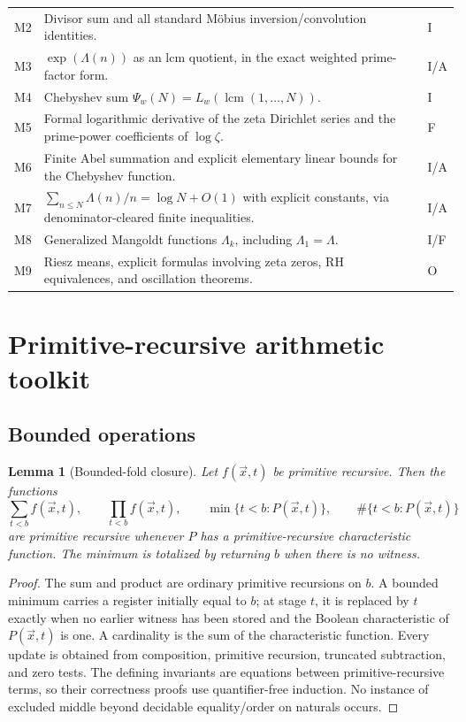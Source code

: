 \documentclass[11pt]{article}
\newtheorem{lemma}[theorem]{Lemma}
\theoremstyle{definition}
\newcommand{\StatusI}{\textsf{I}}
\newcommand{\StatusF}{\textsf{F}}
\newcommand{\StatusA}{\textsf{A}}
\newcommand{\StatusO}{\textsf{O}}
\begin{document}
\begin{longtable}{@{}p{}p{}p{}@{}}
M2 & Divisor sum and all standard M\"obius inversion/convolution identities. & \StatusI\\
M3 & \(\exp(\Lambda(n))\) as an lcm quotient, in the exact weighted prime-factor form. & \StatusI/\StatusA\\
M4 & Chebyshev sum \(\Psi_w(N)=L_w(\operatorname{lcm}(1,\dots,N))\). & \StatusI\\
M5 & Formal logarithmic derivative of the zeta Dirichlet series and the prime-power coefficients of \(\log\zeta\). & \StatusF\\
M6 & Finite Abel summation and explicit elementary linear bounds for the Chebyshev function. & \StatusI/\StatusA\\
M7 & \(\sum_{n\le N}\Lambda(n)/n=\log N+O(1)\) with explicit constants, via denominator-cleared finite inequalities. & \StatusI/\StatusA\\
M8 & Generalized Mangoldt functions \(\Lambda_k\), including \(\Lambda_1=\Lambda\). & \StatusI/\StatusF\\
M9 & Riesz means, explicit formulas involving zeta zeros, RH equivalences, and oscillation theorems. & \StatusO\\
\bottomrule
\end{longtable}

\section{Primitive-recursive arithmetic toolkit}

\subsection{Bounded operations}

\begin{lemma}[Bounded-fold closure]\label{lem:bounded-fold}
Let \(f(\vec x,t)\) be primitive recursive.  Then the functions
\[
 \sum_{t<b}f(\vec x,t),\qquad
 \prod_{t<b}f(\vec x,t),\qquad
 \min\{t<b:P(\vec x,t)\},\qquad
 \#\{t<b:P(\vec x,t)\}
\]
are primitive recursive whenever \(P\) has a primitive-recursive
characteristic function.  The minimum is totalized by returning \(b\) when
there is no witness.
\end{lemma}

\begin{proof}
The sum and product are ordinary primitive recursions on \(b\).  A bounded
minimum carries a register initially equal to \(b\); at stage \(t\), it is
replaced by \(t\) exactly when no earlier witness has been stored and the
Boolean characteristic of \(P(\vec x,t)\) is one.  A cardinality is the sum of
the characteristic function.  Every update is obtained from composition,
primitive recursion, truncated subtraction, and zero tests.  The defining
invariants are equations between primitive-recursive terms, so their
correctness proofs use quantifier-free induction.  No instance of excluded
middle beyond decidable equality/order on naturals occurs.
\end{proof}
\end{document}

